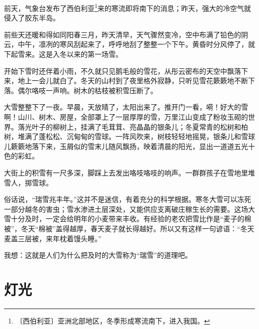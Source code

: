 \documentclass[12pt,UTF-8,openany]{ctexbook}
\begin{document}
\begin{large}
    
    前天，气象台发布了西伯利亚\footnote{〔西伯利亚〕亚洲北部地区，冬季形成寒流南下，进入我国。}来的寒流即将南下的消息；昨天，强大的冷空气就侵入了胶东半岛。
    
    前些天还暖和得如同阳春三月，昨天清早，天气骤然变冷，空中布满了铅色的阴云，中午，凛冽的寒风刮起来了，呼呼地刮了整整一个下午。黄昏时分风停了，就下起雪来。这是入冬以来的第一场雪。
    
    开始下雪时还伴着小雨，不久就只见鹅毛般的雪花，从彤云密布的天空中飘落下来，地上一会儿就白了。冬天的山村到了夜里格外寂静，只听见雪花簌簌地不断下落。偶尔咯吱一声响。树木的枯枝被积雪压断了。
    
    大雪整整下了一夜。早晨，天放晴了，太阳出来了。推开门一看，嗬！好大的雪啊！山川、树木、房屋，全部罩上了一层厚厚的雪，万里江山变成了粉妆玉砌的世界。落光叶子的柳树上，挂满了毛茸茸、亮晶晶的银条儿；冬夏常青的松树和柏树，堆满了蓬松松、沉甸甸的雪球。一阵风吹来，树枝轻轻地摇晃，银条儿和雪球儿簌簌地落下来，玉屑似的雪末儿随风飘扬，映着清晨的阳光，显出一道道五光十色的彩虹。
    
    大街上的积雪有一尺多深，脚踩上去发出咯吱咯吱的响声。一群群孩子在雪地里堆雪人，掷雪球。
    
    俗话说，“瑞雪兆丰年。”这并不是迷信，有着充分的科学根据。寒冬大雪可以冻死一部分越冬的害虫；雪水渗进土层深处，又能供应支离破庄稼生长的需要。这场大雪十分及时，一定会给明年的小麦带来丰收。有经验的老农把雪比作是“麦子的棉被”，冬天“棉被”盖得越厚，春天麦子就长得越好。所以又有这样一句谚语：“冬天麦盖三层被，来年枕着馒头睡。”
    
    我想：这就是人们为什么把及时的大雪称为“瑞雪”的道理吧。
    
\end{large}



\chapter{灯光}
\end{document}
